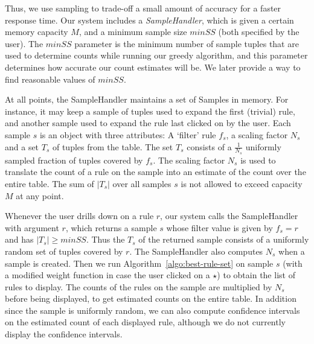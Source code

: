 Thus, we use sampling to trade-off a small amount of accuracy for a faster response time. Our system includes a {\em SampleHandler}, which is given a certain memory capacity $M$, and a minimum sample size $minSS$ (both specified by the user).
The $minSS$ parameter is the minimum number of sample tuples that are used to determine counts while running our greedy algorithm, and this parameter determines how accurate our count estimates will be. We later provide a way to find reasonable values of $minSS$.

At all points, the SampleHandler maintains a set of Samples in memory. For instance, it may keep a sample of tuples used to expand the first (trivial) rule, and another sample used to expand the rule last clicked on by the user. Each sample $s$ is an object with three attributes: A `filter' rule $f_s$, a scaling factor $N_s$ and a set $T_s$ of tuples from the table. The set $T_s$ consists of a $\frac{1}{N_s}$ uniformly sampled fraction of tuples covered by $f_s$. The scaling factor $N_s$ is used to translate the count of a rule on the sample into an estimate of the count over the entire table. The sum of $|T_s|$ over all samples $s$ is not allowed to exceed capacity $M$ at any point. 

Whenever the user drills down on a rule $r$, our system calls the SampleHandler with argument $r$, which returns a sample $s$ whose filter value is given by $f_s = r$ and has $|T_s| \geq minSS$. Thus the $T_s$ of the returned sample consists of a uniformly random set of tuples covered by $r$. The SampleHandler also computes $N_s$ when a sample is created. Then we run Algorithm~\ref{algo:best-rule-set} on sample $s$ (with a modified weight function in case the user clicked on a $\star$) to obtain the list of rules to display. The counts of the rules on the sample are multiplied by $N_s$ before being displayed, to get estimated counts on the entire table. In addition since the sample is uniformly random, we can also compute confidence intervals on the estimated count of each displayed rule, although we do not currently display the confidence intervals.

